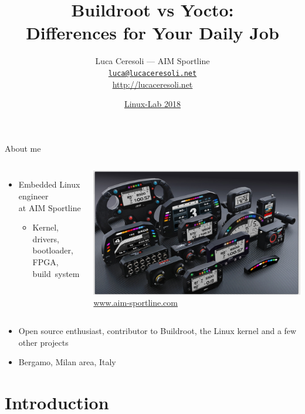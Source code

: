 \documentclass[xetex,table,aspectratio=43]{beamer}
\title{Buildroot vs Yocto:\\Differences for Your Daily Job}
\author{Luca Ceresoli --- AIM Sportline\\
  \href{mailto:luca@lucaceresoli.net}{\tt luca@lucaceresoli.net}\\
  \url{http://lucaceresoli.net}
}
\date{\href{https://2018.linux-lab.it/}{Linux-Lab 2018}}
\begin{document}
\maketitle

\begin{frame}{About me}
  \begin{columns}[t]
    \begin{itemize}
    \item Embedded Linux engineer\\
      at AIM Sportline
      \begin{itemize}
      \item Kernel, drivers, bootloader, FPGA, build~system
      \end{itemize}
    \end{itemize}
    \center
    \includegraphics[width=\textwidth]{../common/images/aim-products.jpg}
    {\small\href{http://www.aim-sportline.com/}{www.aim-sportline.com}}
  \end{columns}
  \begin{itemize}
  \item Open source enthusiast, contributor to Buildroot, the Linux
    kernel and a few other projects
  \item Bergamo, Milan area, Italy
  \end{itemize}
\end{frame}


\section{Introduction}
\end{document}

